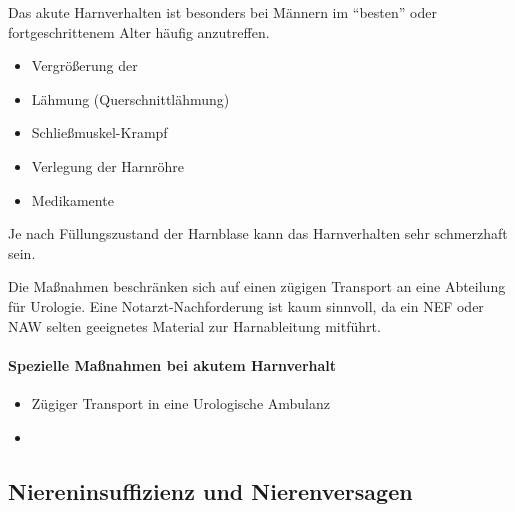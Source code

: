 


Das akute Harnverhalten ist besonders bei Männern im "`besten"'
oder fortgeschrittenem Alter häufig anzutreffen. 

{
\begin{itemize}
     \item Vergrößerung der 
    \item Lähmung (Querschnittlähmung)
    \item Schließmuskel-Krampf
    \item Verlegung der Harnröhre
    \item Medikamente
\end{itemize}}

Je nach Füllungszustand der Harnblase kann das
Harnverhalten sehr schmerzhaft sein.

Die Maßnahmen beschränken sich auf einen zügigen Transport
an eine Abteilung für Urologie. Eine Notarzt-Nachforderung
ist kaum sinnvoll, da ein NEF oder NAW selten geeignetes
Material zur Harnableitung mitführt. 


\paragraph{Spezielle Maßnahmen bei akutem Harnverhalt}

\begin{itemize}
    \item Zügiger Transport in eine Urologische Ambulanz
    \item {}
\end{itemize}



\subsection{Niereninsuffizienz und Nierenversagen}

